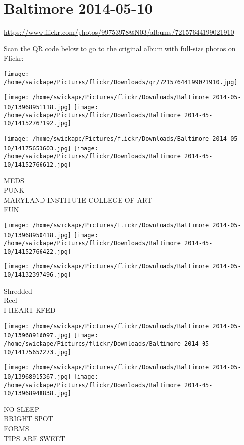 \documentclass[10pt,letterpaper]{article}
\title{}
\author{}
\date{}
\begin{document}
\section*{Baltimore 2014-05-10}

\url{https://www.flickr.com/photos/99753978@N03/albums/72157644199021910}

Scan the QR code below to go to the original album with full-size photos on Flickr:

\texttt{[image: /home/swickape/Pictures/flickr/Downloads/qr/72157644199021910.jpg]}
\pagebreak

\texttt{[image: /home/swickape/Pictures/flickr/Downloads/Baltimore 2014-05-10/13968951118.jpg]}
\texttt{[image: /home/swickape/Pictures/flickr/Downloads/Baltimore 2014-05-10/14152767192.jpg]}

\texttt{[image: /home/swickape/Pictures/flickr/Downloads/Baltimore 2014-05-10/14175653603.jpg]}
\texttt{[image: /home/swickape/Pictures/flickr/Downloads/Baltimore 2014-05-10/14152766612.jpg]}

MEDS\\
PUNK\\
MARYLAND INSTITUTE COLLEGE OF ART\\
FUN
\pagebreak

\texttt{[image: /home/swickape/Pictures/flickr/Downloads/Baltimore 2014-05-10/13968950418.jpg]}
\texttt{[image: /home/swickape/Pictures/flickr/Downloads/Baltimore 2014-05-10/14152766422.jpg]}

\vspace{0.25in}
\texttt{[image: /home/swickape/Pictures/flickr/Downloads/Baltimore 2014-05-10/14132397496.jpg]}

Shredded\\
Reel\\
I HEART KFED
\pagebreak

\texttt{[image: /home/swickape/Pictures/flickr/Downloads/Baltimore 2014-05-10/13968916097.jpg]}
\texttt{[image: /home/swickape/Pictures/flickr/Downloads/Baltimore 2014-05-10/14175652273.jpg]}

\texttt{[image: /home/swickape/Pictures/flickr/Downloads/Baltimore 2014-05-10/13968915367.jpg]}
\texttt{[image: /home/swickape/Pictures/flickr/Downloads/Baltimore 2014-05-10/13968948838.jpg]}

NO SLEEP\\
BRIGHT SPOT\\
FORMS\\
TIPS ARE SWEET
\pagebreak
\end{document}
